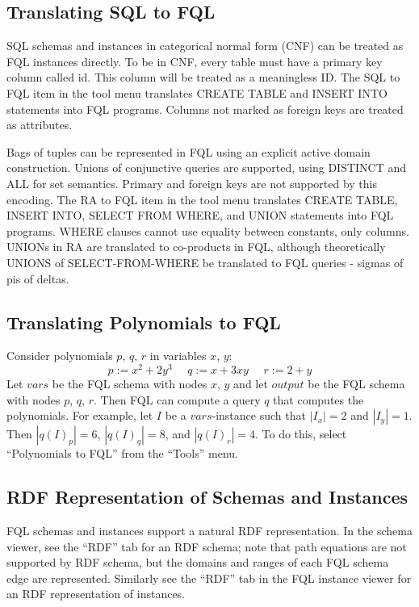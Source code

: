 \documentclass[12pt]{article}
\begin{document}
\subsection{Translating SQL to FQL}

SQL schemas and instances in categorical normal form (CNF) can be treated as FQL instances directly.  To be in CNF, every table must have a primary key column called id.  This column will be treated as a meaningless ID.  The SQL to FQL item in the tool menu translates CREATE TABLE and INSERT INTO statements into FQL programs.  Columns not marked as foreign keys are treated as attributes.

Bags of tuples can be represented in FQL using an explicit active domain construction.  Unions of conjunctive queries are supported, using DISTINCT and ALL for set semantics.  Primary and foreign keys are not supported by this encoding.  The RA to FQL item in the tool menu translates CREATE TABLE, INSERT INTO, SELECT FROM WHERE, and UNION statements into FQL programs.  WHERE clauses cannot use equality between constants, only columns.  UNIONs in RA are translated to co-products in FQL, although theoretically UNIONS of SELECT-FROM-WHERE be translated to FQL queries - sigmas of pis of deltas.

\subsection{Translating Polynomials to FQL}

Consider polynomials $p$, $q$, $r$ in variables $x$, $y$:
$$
p := x^2 + 2y^3 \ \ \ \ \ \ 
q := x + 3xy \ \ \ \ \ \ 
r := 2 + y
$$
Let $vars$ be the FQL schema with nodes $x$, $y$ and let $output$ be the FQL schema with nodes $p$, $q$, $r$.  Then FQL can compute a query $q$ that computes the polynomials.  For example, let $I$ be a $vars$-instance such that $| I_x | = 2$ and $| I_y | = 1$.  Then $| q(I)_p | = 6$, $| q(I)_q | = 8$, and $| q(I)_r | = 4$.  To do this, select ``Polynomials to FQL'' from the ``Tools'' menu.

\subsection{RDF Representation of Schemas and Instances}

FQL schemas and instances support a natural RDF representation.  In the schema viewer, see the ``RDF'' tab for an RDF schema; note that path equations are not supported by RDF schema, but the domains and ranges of each FQL schema edge are represented.  Similarly see the ``RDF'' tab in the FQL instance viewer for an RDF representation of instances.
\end{document}
